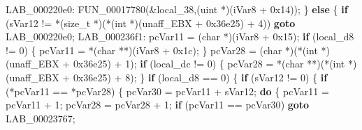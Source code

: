 \documentclass[
]{article}
\newenvironment{Shaded}{}{}
\newcommand{\BaseNTok}[1]{\textcolor[rgb]{0.25,0.63,0.44}{#1}}
\newcommand{\ControlFlowTok}[1]{\textcolor[rgb]{0.00,0.44,0.13}{\textbf{#1}}}
\newcommand{\DataTypeTok}[1]{\textcolor[rgb]{0.56,0.13,0.00}{#1}}
\newcommand{\DecValTok}[1]{\textcolor[rgb]{0.25,0.63,0.44}{#1}}
\newcommand{\NormalTok}[1]{#1}
\newcommand{\OperatorTok}[1]{\textcolor[rgb]{0.40,0.40,0.40}{#1}}
\begin{document}
\begin{Shaded}
\begin{Highlighting}[]
\NormalTok{LAB\_000220e0}\OperatorTok{:}
\NormalTok{    FUN\_00017780}\OperatorTok{(\&}\NormalTok{local\_38}\OperatorTok{,(}\NormalTok{uint }\OperatorTok{*)(}\NormalTok{iVar8 }\OperatorTok{+} \BaseNTok{0x14}\OperatorTok{));}
  \OperatorTok{\}}
  \ControlFlowTok{else} \OperatorTok{\{}
    \ControlFlowTok{if} \OperatorTok{(}\NormalTok{sVar12 }\OperatorTok{!=} \OperatorTok{*(}\DataTypeTok{size\_t} \OperatorTok{*)(*(}\DataTypeTok{int} \OperatorTok{*)(}\NormalTok{unaff\_EBX }\OperatorTok{+} \BaseNTok{0x36e25}\OperatorTok{)} \OperatorTok{+} \DecValTok{4}\OperatorTok{))} \ControlFlowTok{goto}\NormalTok{ LAB\_000220e0}\OperatorTok{;}
\NormalTok{LAB\_000236f1}\OperatorTok{:}
\NormalTok{    pcVar11 }\OperatorTok{=} \OperatorTok{(}\DataTypeTok{char} \OperatorTok{*)(}\NormalTok{iVar8 }\OperatorTok{+} \BaseNTok{0x15}\OperatorTok{);}
    \ControlFlowTok{if} \OperatorTok{(}\NormalTok{local\_d8 }\OperatorTok{!=} \DecValTok{0}\OperatorTok{)} \OperatorTok{\{}
\NormalTok{      pcVar11 }\OperatorTok{=} \OperatorTok{*(}\DataTypeTok{char} \OperatorTok{**)(}\NormalTok{iVar8 }\OperatorTok{+} \BaseNTok{0x1c}\OperatorTok{);}
    \OperatorTok{\}}
\NormalTok{    pcVar28 }\OperatorTok{=} \OperatorTok{(}\DataTypeTok{char} \OperatorTok{*)(*(}\DataTypeTok{int} \OperatorTok{*)(}\NormalTok{unaff\_EBX }\OperatorTok{+} \BaseNTok{0x36e25}\OperatorTok{)} \OperatorTok{+} \DecValTok{1}\OperatorTok{);}
    \ControlFlowTok{if} \OperatorTok{(}\NormalTok{local\_dc }\OperatorTok{!=} \DecValTok{0}\OperatorTok{)} \OperatorTok{\{}
\NormalTok{      pcVar28 }\OperatorTok{=} \OperatorTok{*(}\DataTypeTok{char} \OperatorTok{**)(*(}\DataTypeTok{int} \OperatorTok{*)(}\NormalTok{unaff\_EBX }\OperatorTok{+} \BaseNTok{0x36e25}\OperatorTok{)} \OperatorTok{+} \DecValTok{8}\OperatorTok{);}
    \OperatorTok{\}}
    \ControlFlowTok{if} \OperatorTok{(}\NormalTok{local\_d8 }\OperatorTok{==} \DecValTok{0}\OperatorTok{)} \OperatorTok{\{}
      \ControlFlowTok{if} \OperatorTok{(}\NormalTok{sVar12 }\OperatorTok{!=} \DecValTok{0}\OperatorTok{)} \OperatorTok{\{}
        \ControlFlowTok{if} \OperatorTok{(*}\NormalTok{pcVar11 }\OperatorTok{==} \OperatorTok{*}\NormalTok{pcVar28}\OperatorTok{)} \OperatorTok{\{}
\NormalTok{          pcVar30 }\OperatorTok{=}\NormalTok{ pcVar11 }\OperatorTok{+}\NormalTok{ sVar12}\OperatorTok{;}
          \ControlFlowTok{do} \OperatorTok{\{}
\NormalTok{            pcVar11 }\OperatorTok{=}\NormalTok{ pcVar11 }\OperatorTok{+} \DecValTok{1}\OperatorTok{;}
\NormalTok{            pcVar28 }\OperatorTok{=}\NormalTok{ pcVar28 }\OperatorTok{+} \DecValTok{1}\OperatorTok{;}
            \ControlFlowTok{if} \OperatorTok{(}\NormalTok{pcVar11 }\OperatorTok{==}\NormalTok{ pcVar30}\OperatorTok{)} \ControlFlowTok{goto}\NormalTok{ LAB\_00023767}\OperatorTok{;}

\end{Highlighting}
\end{Shaded}
\end{document}
